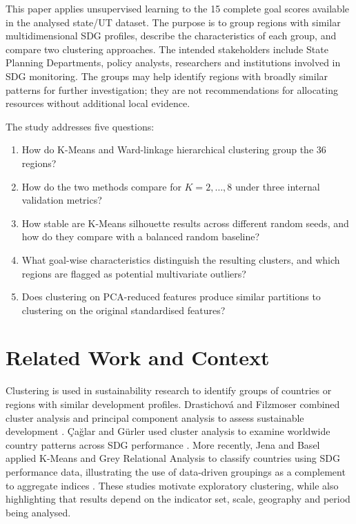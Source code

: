 \documentclass[11pt,a4paper]{article}
\begin{document}
This paper applies unsupervised learning to the 15 complete goal scores available in the analysed state/UT dataset. The purpose is to group regions with similar multidimensional SDG profiles, describe the characteristics of each group, and compare two clustering approaches. The intended stakeholders include State Planning Departments, policy analysts, researchers and institutions involved in SDG monitoring. The groups may help identify regions with broadly similar patterns for further investigation; they are not recommendations for allocating resources without additional local evidence.

The study addresses five questions:
\begin{enumerate}[leftmargin=1.5em]
  \item How do K-Means and Ward-linkage hierarchical clustering group the 36 regions?
  \item How do the two methods compare for $K=2,\ldots,8$ under three internal validation metrics?
  \item How stable are K-Means silhouette results across different random seeds, and how do they compare with a balanced random baseline?
  \item What goal-wise characteristics distinguish the resulting clusters, and which regions are flagged as potential multivariate outliers?
  \item Does clustering on PCA-reduced features produce similar partitions to clustering on the original standardised features?
\end{enumerate}

\section{Related Work and Context}
Clustering is used in sustainability research to identify groups of countries or regions with similar development profiles. Drastichov\'a and Filzmoser combined cluster analysis and principal component analysis to assess sustainable development \cite{drastichova2019}. \c{C}a\u{g}lar and G\"urler used cluster analysis to examine worldwide country patterns across SDG performance \cite{caglar2022}. More recently, Jena and Basel applied K-Means and Grey Relational Analysis to classify countries using SDG performance data, illustrating the use of data-driven groupings as a complement to aggregate indices \cite{jena2025}. These studies motivate exploratory clustering, while also highlighting that results depend on the indicator set, scale, geography and period being analysed.
\end{document}
